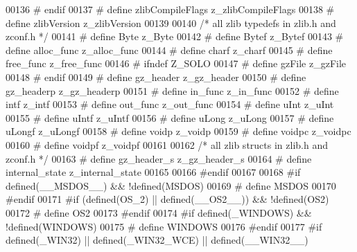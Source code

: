 \begin{DoxyCode}
00136 \textcolor{preprocessor}{#  endif}
00137 \textcolor{preprocessor}{#  define zlibCompileFlags      z\_zlibCompileFlags}
00138 \textcolor{preprocessor}{#  define zlibVersion           z\_zlibVersion}
00139 
00140 \textcolor{comment}{/* all zlib typedefs in zlib.h and zconf.h */}
00141 \textcolor{preprocessor}{#  define Byte                  z\_Byte}
00142 \textcolor{preprocessor}{#  define Bytef                 z\_Bytef}
00143 \textcolor{preprocessor}{#  define alloc\_func            z\_alloc\_func}
00144 \textcolor{preprocessor}{#  define charf                 z\_charf}
00145 \textcolor{preprocessor}{#  define free\_func             z\_free\_func}
00146 \textcolor{preprocessor}{#  ifndef Z\_SOLO}
00147 \textcolor{preprocessor}{#    define gzFile                z\_gzFile}
00148 \textcolor{preprocessor}{#  endif}
00149 \textcolor{preprocessor}{#  define gz\_header             z\_gz\_header}
00150 \textcolor{preprocessor}{#  define gz\_headerp            z\_gz\_headerp}
00151 \textcolor{preprocessor}{#  define in\_func               z\_in\_func}
00152 \textcolor{preprocessor}{#  define intf                  z\_intf}
00153 \textcolor{preprocessor}{#  define out\_func              z\_out\_func}
00154 \textcolor{preprocessor}{#  define uInt                  z\_uInt}
00155 \textcolor{preprocessor}{#  define uIntf                 z\_uIntf}
00156 \textcolor{preprocessor}{#  define uLong                 z\_uLong}
00157 \textcolor{preprocessor}{#  define uLongf                z\_uLongf}
00158 \textcolor{preprocessor}{#  define voidp                 z\_voidp}
00159 \textcolor{preprocessor}{#  define voidpc                z\_voidpc}
00160 \textcolor{preprocessor}{#  define voidpf                z\_voidpf}
00161 
00162 \textcolor{comment}{/* all zlib structs in zlib.h and zconf.h */}
00163 \textcolor{preprocessor}{#  define gz\_header\_s           z\_gz\_header\_s}
00164 \textcolor{preprocessor}{#  define internal\_state        z\_internal\_state}
00165 
00166 \textcolor{preprocessor}{#endif}
00167 
00168 \textcolor{preprocessor}{#if defined(\_\_MSDOS\_\_) && !defined(MSDOS)}
00169 \textcolor{preprocessor}{#  define MSDOS}
00170 \textcolor{preprocessor}{#endif}
00171 \textcolor{preprocessor}{#if (defined(OS\_2) || defined(\_\_OS2\_\_)) && !defined(OS2)}
00172 \textcolor{preprocessor}{#  define OS2}
00173 \textcolor{preprocessor}{#endif}
00174 \textcolor{preprocessor}{#if defined(\_WINDOWS) && !defined(WINDOWS)}
00175 \textcolor{preprocessor}{#  define WINDOWS}
00176 \textcolor{preprocessor}{#endif}
00177 \textcolor{preprocessor}{#if defined(\_WIN32) || defined(\_WIN32\_WCE) || defined(\_\_WIN32\_\_)}

\end{DoxyCode}

